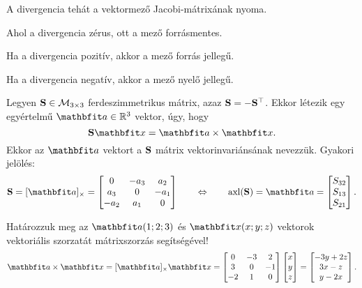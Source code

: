 \documentclass{szb-practice}
\begin{document}
\begin{note}
  A divergencia tehát a vektormező Jacobi-mátrixának nyoma.
\end{note}

\begin{note}
  Ahol a divergencia zérus, ott a mező forrásmentes.

  Ha a divergencia pozitív, akkor a mező forrás jellegű.

  Ha a divergencia negatív, akkor a mező nyelő jellegű.
\end{note}

\begin{definition}[Vektorinvariáns]
  Legyen $\mathbf{S} \in \mathcal M_{3 \times 3}$ ferdeszimmetrikus mátrix, azaz
  $\mathbf{S} = -\mathbf{S}^\top$. Ekkor létezik egy egyértelmű $\rvec a \in \Reals^3$
  vektor, úgy, hogy
  $$
    \rmat S \rvec x = \rvec a \times \rvec x
    \text.
  $$
  Ekkor az $\rvec a$ vektort a $\mathbf{S}$ mátrix vektorinvariánsának nevezzük.
  Gyakori jelölés:
  $$
    \rmat S = [\rvec a]_{\times} = \begin{bmatrix}
      0    & -a_3 & a_2  \\
      a_3  & 0    & -a_1 \\
      -a_2 & a_1  & 0
    \end{bmatrix}
    \qquad \Leftrightarrow \qquad
    \operatorname{axl}(\rmat S) = \rvec a = \begin{bmatrix}
      S_{32} \\
      S_{13} \\
      S_{21}
    \end{bmatrix}
    \text.
  $$
\end{definition}

\begin{example}[][nobreak]
  Határozzuk meg az $\rvec a(1;2;3)$ és $\rvec x(x;y;z)$ vektorok vektoriális
  szorzatát mátrixszorzás segítségével!
  $$
    \rvec a \times \rvec x
    = [\rvec a]_{\times} \rvec x
    = \begin{bmatrix}
      0  & -3 & 2  \\
      3  & 0  & -1 \\
      -2 & 1  & 0
    \end{bmatrix} \begin{bmatrix}
      x \\ y \\ z
    \end{bmatrix} = \begin{bmatrix}
      -3y + 2z \\
      3x - z   \\
      y - 2x
    \end{bmatrix}
    \text.
  $$
\end{example}
\end{document}
